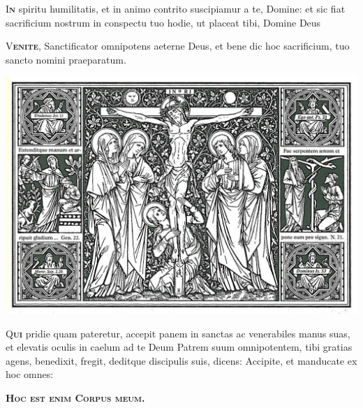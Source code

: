 \documentclass[12pt,a3paper, landscape]{scrartcl}
\newcommand{\krzyz}{\textcolor{red}{\raisebox{-1mm}{\scalebox{1.5}{\ding{64}}}}}
\newcommand{\initial}[2]{\lettrine[lines=3]{\color{Maroon}#1}{\bfseries\color{Maroon}#2}}
\newcommand{\gap}{\vspace*{0.1cm}}
\begin{document}
\begin{center}
\begin{minipage}[t]{0.28\linewidth}
        \gap

        \initial{I}{n} spiritu humilitatis, et in animo contrito suscipiamur a
        te, Domine: et sic fiat sacrificium nostrum in conspectu tuo hodie, ut
        placeat tibi, Domine Deus

        \gap

        \initial{V}{enite}, Sanctificator omnipotens aeterne Deus, et bene\krzyz
        dic hoc sacrificium, tuo sancto nomini praeparatum.

    \end{minipage}
    \hspace*{0.2cm}
    \begin{minipage}[t]{0.28\linewidth}

        \vspace*{2.2cm}

        \begin{center}
            \includegraphics[width=\linewidth]{cross.jpg}
        \end{center}

        \vfill

        \lettrine[lines=3,depth=1]{\color{Maroon}Q}{\bfseries\color{Maroon}ui} pridie
        quam pateretur, accepit panem in sanctas ac venerabiles manus suas, et
        elevatis oculis in caelum ad te Deum Patrem suum omnipotentem, tibi
        gratias agens, bene\krzyz dixit, fregit, deditque discipulis suis,
        dicens: Accipite, et manducate ex hoc omnes:

        \gap

        \begin{center}
            \Large\color{Maroon}

            \textbf{\textsc{Hoc est enim Corpus meum.}}
        \end{center}


\end{minipage}
\end{center}
\end{document}
